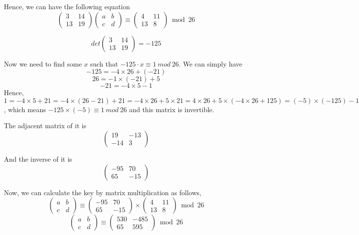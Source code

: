 \documentclass[12pt,a4paper]{article}
\theoremstyle{definition}
\begin{document}
Hence, we can have the following equation
$$
\left(\begin{array}{cc}
3 & 14 \\
13 & 19
\end{array}\right)
\left(\begin{array}{ll}
a & b \\
c & d
\end{array}\right) 
\equiv
\left(\begin{array}{cc}
4 & 11 \\
13 & 8
\end{array}\right) \bmod 26
$$

$$
det\left(
\begin{matrix}
3&14\\
13&19
\end{matrix}
\right)=-125
$$

Now we need to find some $x$ such that $-125\cdot x\equiv 1\ mod\ 26$. 
We can simply have 
$$-125=-4\times 26+(-21)$$
$$26=-1\times (-21)+5$$
$$-21=-4\times 5-1$$
Hence, $1=-4\times 5+21=-4\times (26-21)+21=-4\times 26+5\times 21=4\times 26+5\times (-4\times 26+125)=(-5)\times (-125)-16\times 26$, which means $-125\times (-5)\equiv 1\ mod\ 26$ and this matrix is invertible. 

The adjacent matrix of it is 
$$
\left(
\begin{matrix}
19&-13\\
-14&3
\end{matrix}
\right)
$$

And the inverse of it is 
$$
\left(
\begin{matrix}
-95&70\\
65&-15
\end{matrix}
\right)
$$

Now, we can calculate the key by matrix multiplication as follows, 
$$
\left(\begin{array}{ll}
a & b \\
c & d
\end{array}\right) 
\equiv
\left(
\begin{matrix}
-95&70\\
65&-15
\end{matrix}
\right)\times 
\left(\begin{array}{cc}
4 & 11 \\
13 & 8
\end{array}\right) \bmod 26
$$
$$
\left(\begin{array}{ll}
a & b \\
c & d
\end{array}\right) 
\equiv
\left(\begin{array}{cc}
530 & -485 \\
65 & 595
\end{array}\right) \bmod 26
$$
\end{document}

